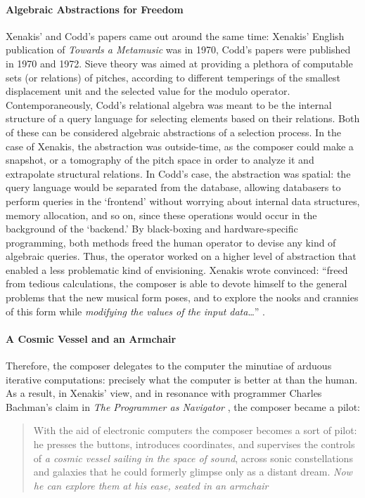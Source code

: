 \paragraph{Algebraic Abstractions for Freedom}
Xenakis' and Codd's papers came out around the same time: Xenakis' English publication of \textit{Towards a Metamusic} was in 1970, Codd's papers were published in 1970 and 1972. Sieve theory was aimed at providing a plethora of computable sets (or relations) of pitches, according to different temperings of the smallest displacement unit and the selected value for the modulo operator. Contemporaneously, Codd's relational algebra was meant to be the internal structure of a query language for selecting elements based on their relations. Both of these can be considered algebraic abstractions of a selection process. In the case of Xenakis, the abstraction was outside-time, as the composer could make a snapshot, or a tomography of the pitch space in order to analyze it and extrapolate structural relations. In Codd's case, the abstraction was spatial: the query language would be separated from the database, allowing databasers to perform queries in the `frontend' without worrying about internal data structures, memory allocation, and so on, since these operations would occur in the background of the `backend.' By black-boxing and hardware-specific programming, both methods freed the human operator to devise any kind of algebraic queries. Thus, the operator worked on a higher level of abstraction that enabled a less problematic kind of envisioning. Xenakis wrote convinced: ``freed from tedious calculations, the composer is able to devote himself to the general problems that the new musical form poses, and to explore the nooks and crannies of this form while \textit{modifying the values of the input data}\dots'' \im \parencite[144]{Xen92:For}.

\paragraph{A Cosmic Vessel and an Armchair}
Therefore, the composer delegates to the computer the minutiae of arduous iterative computations: precisely what the computer is better at than the human. As a result, in Xenakis' view, and in resonance with programmer Charles Bachman's claim in \textit{The Programmer as Navigator} \parencite{Bachman:1973:PN:355611.362534}, the composer became a pilot:

\begin{quote}
	With the aid of electronic computers the composer becomes a sort of pilot: he presses the buttons, introduces coordinates, and supervises the controls of \textit{a cosmic vessel sailing in the space of sound}, across sonic constellations and galaxies that he could formerly glimpse only as a distant dream. \textit{Now he can explore them at his ease, seated in an armchair} \im \parencite[144]{Xen92:For}
\end{quote}

